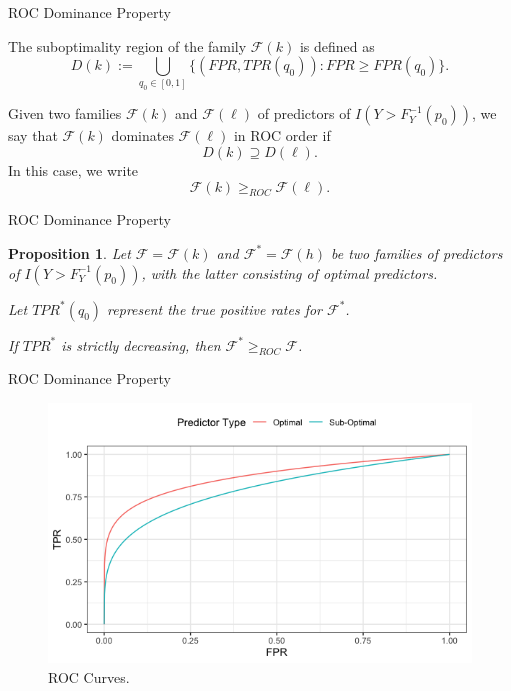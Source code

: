\documentclass{beamer}
\newtheorem{proposition}{Proposition}
\begin{document}
\begin{frame}{ROC Dominance Property}
    \begin{definition}    
        The suboptimality region of the family $\mathcal{F}(k)$ is defined as
        \[
        D(k) := \bigcup_{q_0 \in [0, 1]} \{(FPR, TPR(q_0)) : FPR \ge FPR(q_0)\}.
        \]
    \end{definition}
    
    \begin{definition}
        Given two families $\mathcal{F}(k)$ and $\mathcal{F}(\ell)$ of predictors of $I(Y > F_Y^{-1}(p_0))$, we say that $\mathcal{F}(k)$ dominates $\mathcal{F}(\ell)$ in ROC order if
        \[
        D(k) \supseteq D(\ell).
        \]
        In this case, we write
        \[
        \mathcal{F}(k) \ge_{ROC} \mathcal{F}(\ell).
        \]
    \end{definition}
\end{frame}

\begin{frame}{ROC Dominance Property}
    \begin{proposition}
        Let $\mathcal{F} = \mathcal{F}(k)$ and $\mathcal{F}^* = \mathcal{F}(h)$ be two families of predictors of $I(Y > F_Y^{-1}(p_0))$, with the latter consisting of optimal predictors.

        \medskip
        
        Let $TPR^*(q_0)$ represent the true positive rates for $\mathcal{F}^*$.

        \medskip

        If $TPR^*$ is strictly decreasing, then $\mathcal{F}^* \ge_{ROC} \mathcal{F}$.
    \end{proposition}
\end{frame}

\begin{frame}{ROC Dominance Property}
    \begin{figure}[h!]
        \centering
        \includegraphics[scale=0.4]{roc_curves.png}
        \caption{ROC Curves.}
        \label{fig:roc_curves}
    \end{figure}
\end{frame}
\end{document}
